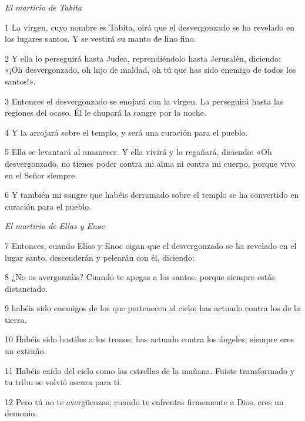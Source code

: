 \par \textit{El martirio de Tabita}

\par 1 La virgen, cuyo nombre es Tabita, oirá que el desvergonzado se ha revelado en los lugares santos. Y se vestirá su manto de lino fino.

\par 2 Y ella lo perseguirá hasta Judea, reprendiéndolo hasta Jerusalén, diciendo: «¡Oh desvergonzado, oh hijo de maldad, oh tú que has sido enemigo de todos los santos!».

\par 3 Entonces el desvergonzado se enojará con la virgen. La perseguirá hasta las regiones del ocaso. Él le chupará la sangre por la noche.

\par 4 Y la arrojará sobre el templo, y será una curación para el pueblo.

\par 5 Ella se levantará al amanecer. Y ella vivirá y lo regañará, diciendo: «Oh desvergonzado, no tienes poder contra mi alma ni contra mi cuerpo, porque vivo en el Señor siempre.

\par 6 Y también mi sangre que habéis derramado sobre el templo se ha convertido en curación para el pueblo.


\par \textit{El martirio de Elías y Enoc}

\par 7 Entonces, cuando Elías y Enoc oigan que el desvergonzado se ha revelado en el lugar santo, descenderán y pelearán con él, diciendo:

\par 8 ¿No os avergonzáis? Cuando te apegas a los santos, porque siempre estás distanciado.

\par 9 habéis sido enemigos de los que pertenecen al cielo; has actuado contra los de la tierra.

\par 10 Habéis sido hostiles a los tronos; has actuado contra los ángeles; siempre eres un extraño.

\par 11 Habéis caído del cielo como las estrellas de la mañana. Fuiste transformado y tu tribu se volvió oscura para ti.

\par 12 Pero tú no te avergüenzas; cuando te enfrentas firmemente a Dios, eres un demonio.

